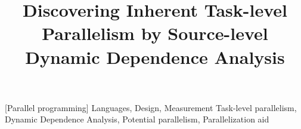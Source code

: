 \documentclass[preprint,natbib]{sigplanconf}
\begin{document}
\title{Discovering Inherent Task-level Parallelism by Source-level Dynamic Dependence Analysis}

          
\maketitle 



[Parallel programming]
\terms
Languages, Design, Measurement
\keywords
Task-level parallelism, Dynamic Dependence Analysis, Potential parallelism, Parallelization aid








%


{}
\end{document}
